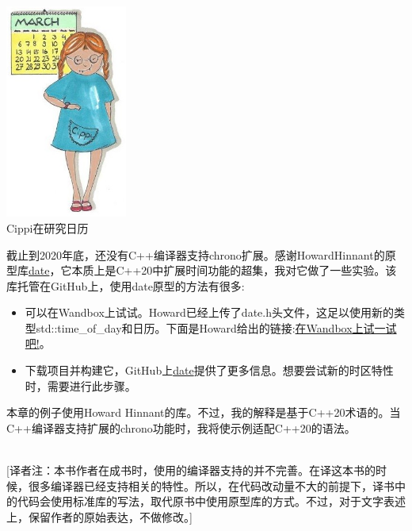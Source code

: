 \begin{center}
\includegraphics[width=0.3\textwidth]{content/3/chapter5/images/18.png}\\
Cippi在研究日历
\end{center}

\begin{tcolorbox}[breakable,enhanced jigsaw,colback=blue!5!white,colframe=blue!75!black,title={缺少编译器支持}]
	
截止到2020年底，还没有C++编译器支持chrono扩展。感谢HowardHinnant的原型库\href{https://github.com/HowardHinnant/date}{date}，它本质上是C++20中扩展时间功能的超集，我对它做了一些实验。该库托管在GitHub上，使用date原型的方法有很多:

\begin{itemize}
\item 
可以在Wandbox上试试。Howard已经上传了date.h头文件，这足以使用新的类型std::time\_of\_day和日历。下面是Howard给出的链接:\href{https://wandbox.org/permlink/L8MwjzSSC3fXXrMd}{在Wandbox上试一试吧!}。

\item 
下载项目并构建它，GitHub上\href{https://github.com/HowardHinnant/date}{date}提供了更多信息。想要尝试新的时区特性时，需要进行此步骤。
\end{itemize}

本章的例子使用Howard Hinnant的库。不过，我的解释是基于C++20术语的。当C++编译器支持扩展的chrono功能时，我将使示例适配C++20的语法。

\hspace*{\fill} \\ %
{}[译者注：本书作者在成书时，使用的编译器支持的并不完善。在译这本书的时候，很多编译器已经支持相关的特性。所以，在代码改动量不大的前提下，译书中的代码会使用标准库的写法，取代原书中使用原型库的方式。不过，对于文字表述上，保留作者的原始表达，不做修改。]
\end{tcolorbox}

